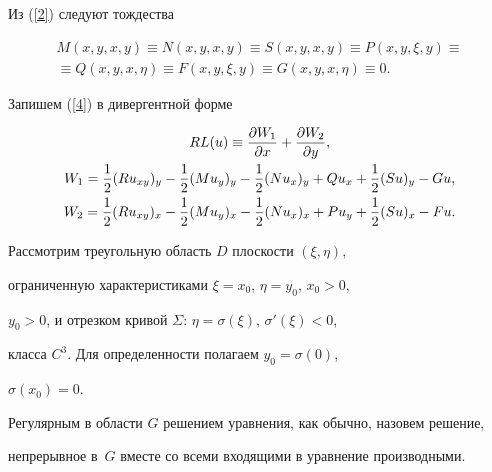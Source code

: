 Из (\ref{2}) следуют тождества


\begin{equation}\label{5}


\begin{array}{c}


M(x,y,x,y)\equiv N(x,y,x,y)\equiv S(x,y,x,y)\equiv P(x,y,\xi,y)\equiv \\[2mm]


\equiv Q(x,y,x,\eta)\equiv F(x,y,\xi,y)\equiv G(x,y,x,\eta)\equiv 0.


\end{array}


\end{equation}





Запишем (\ref{4}) в дивергентной форме


\begin{gather}\label{6}


RL(u)\equiv\frac{\partial W_1}{\partial x}+\frac{\partial W_2}{\partial y},\\


%


W_1=\frac{1}{2}(Ru_{xy})_{y}-\frac{1}{2}(Mu_y)_{y}


-\frac{1}{2}(Nu_x)_{y}+Qu_{x}+\frac{1}{2}(Su)_{y}-Gu,\notag\\


%


W_2=\frac{1}{2}(Ru_{xy})_{x}-\frac{1}{2}(Mu_y)_{x}


-\frac{1}{2}(Nu_x)_{x}+Pu_{y}+\frac{1}{2}(Su)_{x}-Fu.\notag


\end{gather}





Рассмотрим треугольную область $D$ плоскости $(\xi,\eta)$,


ограниченную характеристиками $\xi=x_{0}$, $\eta=y_{0}$, $x_{0}>0$,


$y_{0}>0$, и отрезком кривой $\Sigma$: $\eta=\sigma(\xi)$, $\sigma'(\xi)<0$,


класса $C^{3}$. Для определенности полагаем $y_{0}=\sigma(0)$,


$\sigma(x_{0})=0$.





Регулярным в области $G$ решением уравнения, как обычно, назовем решение,


непрерывное в~$G$ вместе со всеми входящими в уравнение производными.


